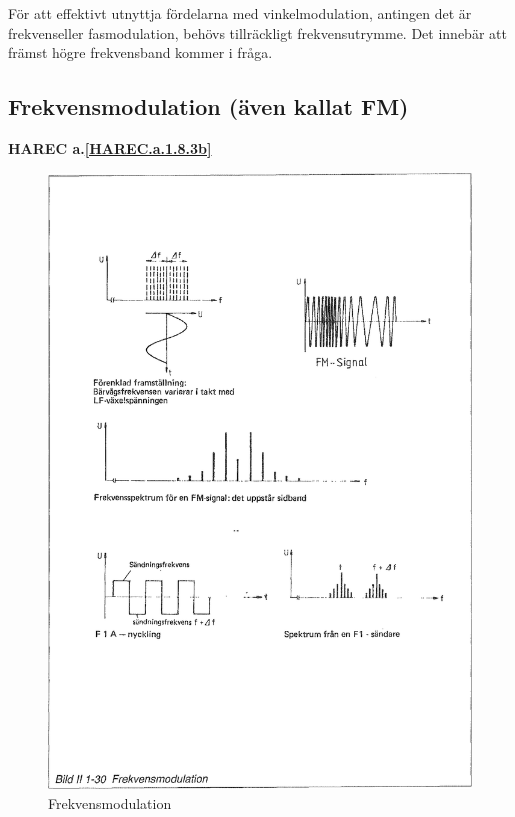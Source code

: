 För att effektivt utnyttja fördelarna med vinkelmodulation, antingen det är
frekvenseller fasmodulation, behövs tillräckligt frekvensutrymme. Det innebär
att främst högre frekvensband kommer i fråga.

\subsection{Frekvensmodulation (även kallat FM)}
\textbf{HAREC a.\ref{HAREC.a.1.8.3b}\label{myHAREC.a.1.8.3b}}

\begin{figure}[ht]
\begin{center}
\includegraphics[width=14cm]{images/bild_2_1-30}
\caption{Frekvensmodulation}
\label{fig:BildII1-30}
\end{center}
\end{figure}

